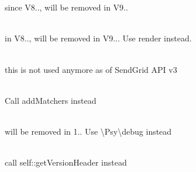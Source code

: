 \begin{DoxyRefList}
\item[Global \doxylink{class_sebastian_bergmann_1_1_environment_1_1_runtime_ae5462faec6e8b35c79aae6c2702cf5b1}{Runtime\+::get\+Raw\+Binary} ()]\hfill \\
\label{deprecated__deprecated000429}%
%
  
\item[Global \doxylink{class_sabberworm_1_1_c_s_s_1_1_property_1_1_selector_a64670ba06318fd365ac1ca203d630ef4}{Selector\+::\+\_\+\+\_\+construct} (\$s\+Selector, \$b\+Calculate\+Specificity=false)]\hfill \\
\label{deprecated__deprecated000395}%
%
since V8.., will be removed in V9..  
\item[Global \doxylink{class_sabberworm_1_1_c_s_s_1_1_property_1_1_selector_a7516ca30af0db3cdbf9a7739b48ce91d}{Selector\+::\+\_\+\+\_\+to\+String} ()]\hfill \\
\label{deprecated__deprecated000396}%
%
in V8.., will be removed in V9... Use {\ttfamily render} instead.  
\item[Global \doxylink{class_monolog_1_1_handler_1_1_send_grid_handler_a320dcab60ac54f2674942cd75b94cc3f}{Send\+Grid\+Handler\+::\$api\+User} ]\hfill \\
\label{deprecated__deprecated000179}%
%
this is not used anymore as of Send\+Grid API v3  
\item[Global \doxylink{class_psy_1_1_shell_ac3ea07db68f7969d52cd9d07cfc6270d}{Shell\+::add\+Tab\+Completion\+Matchers} (array \$matchers)]\hfill \\
\label{deprecated__deprecated000338}%
%
Call {\ttfamily add\+Matchers} instead 
\item[Global \doxylink{class_psy_1_1_shell_ac14d00702aab6724290d35c9afd0f022}{Shell\+::debug} (array \$vars=\mbox{[}\mbox{]}, \$bind\+To=null)]\hfill \\
\label{deprecated__deprecated000337}%
%
will be removed in 1.. Use \textbackslash{}\+Psy\textbackslash{}debug instead 
\item[Global \doxylink{class_psy_1_1_shell_afa8e7a3a646144eab50188b7a805a389}{Shell\+::get\+Version} ()]\hfill \\
\label{deprecated__deprecated000339}%
%
call self\+::get\+Version\+Header instead  

\end{DoxyRefList}
